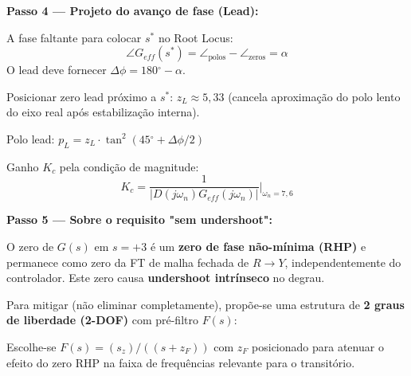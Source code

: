 \documentclass[12pt,a4paper]{article}
\newcommand{\degrees}{\ensuremath{^{\circ}}}
\begin{document}
\textbf{Passo 4 — Projeto do avanço de fase (Lead):}

A fase faltante para colocar $s^*$ no Root Locus:
\[
  \angle G_{eff}(s^*) = \angle_{\text{polos}} - \angle_{\text{zeros}} = \alpha
\]
O lead deve fornecer $\Delta\phi = 180\degrees - \alpha$.

Posicionar zero lead próximo a $s^*$: $z_L \approx 5{,}33$ (cancela aproximação
do polo lento do eixo real após estabilização interna).

Polo lead: $p_L = z_L \cdot \tan^2\!\!\left(45\degrees + \Delta\phi/2\right)$

Ganho $K_c$ pela condição de magnitude:
\[
  K_c = \frac{1}{\left|D(j\omega_n) G_{eff}(j\omega_n)\right|} \bigg|_{\omega_n = 7{,}6}
\]

\textbf{Passo 5 — Sobre o requisito "sem undershoot":}

O zero de $G(s)$ em $s = +3$ é um \textbf{zero de fase não-mínima (RHP)}
e permanece como zero da FT de malha fechada de $R \to Y$, independentemente
do controlador. Este zero causa \textbf{undershoot intrínseco} no degrau.

Para mitigar (não eliminar completamente), propõe-se uma estrutura de
\textbf{2 graus de liberdade (2-DOF)} com pré-filtro $F(s)$:

\begin{center}
\end{center}

Escolhe-se $F(s) = (s_z)/((s+z_F))$ com $z_F$ posicionado para atenuar o
efeito do zero RHP na faixa de frequências relevante para o transitório.
\end{document}
